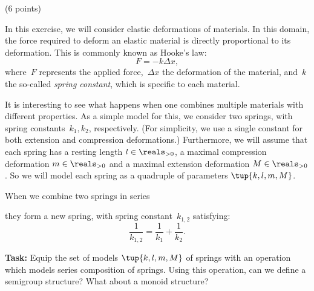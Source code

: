 \documentclass[paper=8.125in:10.250in,pagesize=pdftex,
    headinclude=false,footinclude=false,oneside,egregdoesnotlikesansseriftitles]{kaobook}
\begin{document}

\clearpage

\begin{gradedexercise} (6 points)

%

    In this exercise, we will consider elastic deformations of materials. In this domain, the force required to deform an elastic material is directly proportional to its deformation.
    This is commonly known as Hooke's law:
    \begin{equation*}
        F=-k\Delta x,
    \end{equation*}
    where~$F$ represents the applied force,~$\Delta x$ the deformation of the material, and~$k$ the so-called \emph{spring constant}, which is specific to each material.

    It is interesting to see what happens when one combines multiple materials with different properties.
    As a simple model for this, we consider two springs, with spring constants~$k_1,k_2$, respectively. (For simplicity, we use a single constant for both extension and compression deformations.) Furthermore, we will assume that each spring has a resting length $l \in \reals_{> 0}$, a maximal compression deformation $m \in \reals_{> 0}$ and a maximal extension deformation $M \in \reals_{> 0}$. So we will model each spring as a quadruple of parameters $\tup{k, l, m, M}$. 


 When we combine two springs in series

     \begin{center}
        \end{center}
    they form a new spring, with spring constant~$k_{1,2}$ satisfying:
    \begin{equation*}
        \frac{1}{k_{1,2}}=\frac{1}{k_1}+\frac{1}{k_2}.
    \end{equation*}


\textbf{Task:} Equip the set of models $\tup{k, l, m, M}$ of springs with an operation which models series composition of springs. Using this operation, can we define a semigroup structure? What about a monoid structure?
\end{gradedexercise}

\end{document}
